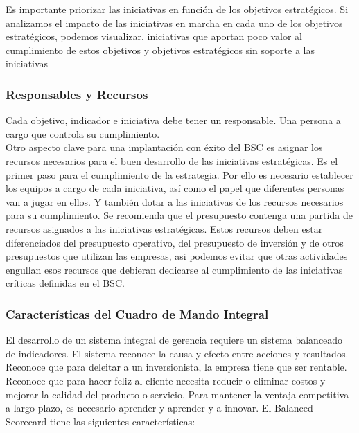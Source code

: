 \documentclass[preprint,12pt]{elsarticle}
\begin{document}
Es importante priorizar las iniciativas en función de los objetivos estratégicos. Si analizamos el impacto de las iniciativas en marcha en cada uno de los objetivos estratégicos, podemos visualizar, iniciativas que aportan poco valor al cumplimiento de estos objetivos y objetivos estratégicos sin soporte a las iniciativas

\subsubsection{\textbf{Responsables y Recursos}}

Cada objetivo, indicador e iniciativa debe tener un responsable. Una persona a cargo que controla su cumplimiento.
\\
Otro aspecto clave para una implantación con éxito del BSC es asignar los recursos necesarios para el buen desarrollo de las iniciativas estratégicas. Es el primer paso para el cumplimiento de la estrategia. Por ello es necesario establecer los equipos a cargo de cada iniciativa, así como el papel que diferentes personas van a jugar en ellos. Y también dotar a las iniciativas de los recursos necesarios para su cumplimiento. Se recomienda que el presupuesto contenga una partida de recursos asignados a las iniciativas estratégicas. Estos recursos deben estar diferenciados del presupuesto operativo, del presupuesto de inversión y de otros presupuestos que utilizan las empresas, asi podemos evitar que otras actividades engullan esos recursos que debieran dedicarse al cumplimiento de las iniciativas críticas definidas en el BSC.

\subsubsection{\textbf{Características del Cuadro de Mando Integral}}

El desarrollo de un sistema integral de gerencia requiere un sistema balanceado de indicadores. El sistema reconoce la causa y efecto entre acciones y resultados. Reconoce que para deleitar a un inversionista, la empresa tiene que ser rentable. Reconoce que para hacer feliz al cliente necesita reducir o eliminar costos y mejorar la calidad del producto o servicio. Para mantener la ventaja competitiva a largo plazo, es necesario aprender y aprender y a innovar. El Balanced Scorecard tiene las siguientes características:
\end{document}
